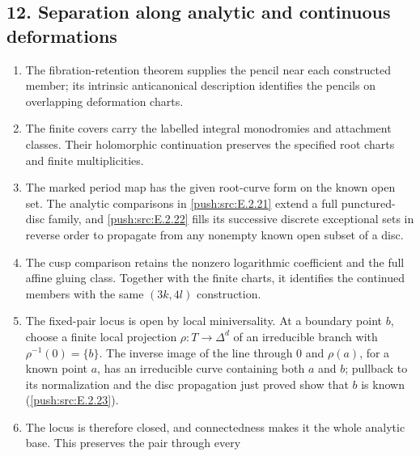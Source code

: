 \subsection*{12. Separation along analytic and continuous deformations}
\RungOne
\begin{enumerate}[label=\arabic*.,leftmargin=*]
\item The fibration-retention theorem supplies the pencil near
each constructed member; its intrinsic anticanonical description
identifies the pencils on overlapping deformation charts.
\item The finite covers carry the labelled integral monodromies
and attachment classes.  Their holomorphic continuation preserves
the specified root charts and finite multiplicities.
\item The marked period map has the given root-curve form on the
known open set.  The analytic comparisons in
\ref{push:src:E.2.21} extend a full punctured-disc family, and
\ref{push:src:E.2.22} fills its successive discrete exceptional
sets in reverse order to propagate from any nonempty known open
subset of a disc.
\item The cusp comparison retains the nonzero logarithmic
coefficient and the full affine gluing class.  Together with the
finite charts, it identifies the continued members with the same
$(3k,4l)$ construction.
\item The fixed-pair locus is open by local miniversality.  At a
boundary point $b$, choose a finite local projection
$\rho:T\to\Delta^d$ of an irreducible branch with
$\rho^{-1}(0)=\{b\}$.  The inverse image of the line through
$0$ and $\rho(a)$, for a known point $a$, has an irreducible
curve containing both $a$ and $b$; pullback to its normalization
and the disc propagation just proved show that $b$ is known
(\ref{push:src:E.2.23}).
\item The locus is therefore closed, and connectedness makes it
the whole analytic base.  This preserves the pair through every

\end{enumerate}
